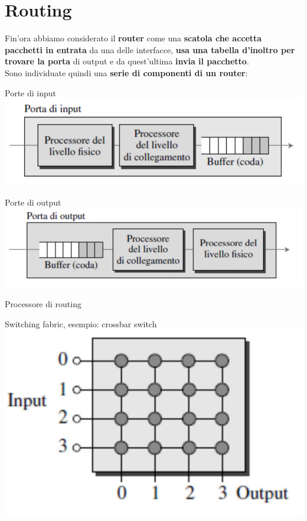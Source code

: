 \documentclass[10pt]{article}
\begin{document}
\section{Routing}
Fin'ora abbiamo considerato il \textbf{router} come una \textbf{scatola che accetta pacchetti in entrata} da una delle interfacce, \textbf{usa una tabella d'inoltro per trovare la porta} di output e da quest'ultima \textbf{invia il pacchetto}.\\
Sono individuate quindi una \textbf{serie di componenti di un router}:
\begin{list}{}{}
\item Porte di input\\
\includegraphics[scale=0.33]{routerportain.png}
\item Porte di output\\
\includegraphics[scale=0.33]{routerportaout.png}
\item Processore di routing
\item Switching fabric, esempio: crossbar switch\\
\includegraphics[scale=0.33]{routerswitchfabric.png}
\end{list}
\end{document}
